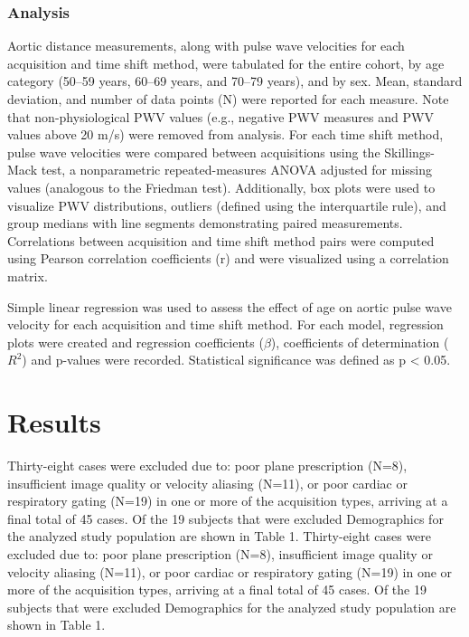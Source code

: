 \subsubsection{Analysis}
Aortic distance measurements, along with pulse wave velocities for each acquisition and time shift method, were tabulated for the entire cohort, by age category (50--59 years, 60--69 years, and 70--79 years), and by sex. Mean, standard deviation, and number of data points (N) were reported for each measure. Note that non-physiological PWV values (e.g., negative PWV measures and PWV values above 20 m/s) were removed from analysis. For each time shift method, pulse wave velocities were compared between acquisitions using the Skillings-Mack test, a nonparametric repeated-measures ANOVA adjusted for missing values (analogous to the Friedman test). Additionally, box plots were used to visualize PWV distributions, outliers (defined using the interquartile rule), and group medians with line segments demonstrating paired measurements. Correlations between acquisition and time shift method pairs were computed using Pearson correlation coefficients (r) and were visualized using a correlation matrix. 

Simple linear regression was used to assess the effect of age on aortic pulse wave velocity for each acquisition and time shift method. For each model, regression plots were created and regression coefficients ($\beta$), coefficients of determination ($R^2$) and p-values were recorded. Statistical significance was defined as p < 0.05.


\section{Results}\label{sec:life_results}
Thirty-eight cases were excluded due to: poor plane prescription (N=8), insufficient image quality or velocity aliasing (N=11), or poor cardiac or respiratory gating (N=19) in one or more of the acquisition types, arriving at a final total of 45 cases. Of the 19 subjects that were excluded  Demographics for the analyzed study population are shown in Table 1. Thirty-eight cases were excluded due to: poor plane prescription (N=8), insufficient image quality or velocity aliasing (N=11), or poor cardiac or respiratory gating (N=19) in one or more of the acquisition types, arriving at a final total of 45 cases. Of the 19 subjects that were excluded  Demographics for the analyzed study population are shown in Table 1.

